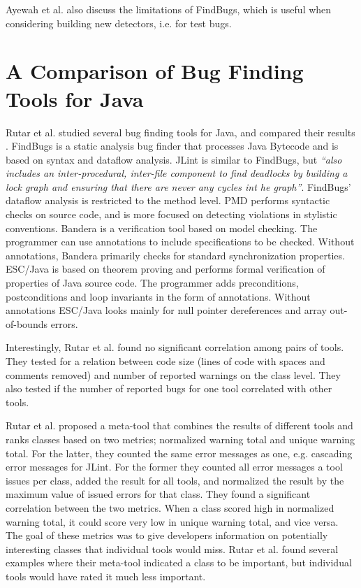 \documentclass{uvamscse}
\newcommand{\AFBEval}{Ayewah et al.}
\newcommand{\AComparisonBugTools}{Rutar et al.}
\begin{document}
\AFBEval{} also discuss the limitations of FindBugs, which is useful when considering building new detectors, i.e. for test bugs.

\section{A Comparison of Bug Finding Tools for Java}
\AComparisonBugTools{} studied several bug finding tools for Java, and compared their results \cite{rutar2004comparison}. FindBugs is a static analysis bug finder that processes Java Bytecode and is based on syntax and dataflow analysis. JLint is similar to FindBugs, but \textit{``also includes an inter-procedural, inter-file component to find deadlocks by building a lock graph and ensuring that there are never any cycles int he graph''}. FindBugs' dataflow analysis is restricted to the method level. PMD performs syntactic checks on source code, and is more focused on detecting violations in stylistic conventions. Bandera is a verification tool based on model checking. The programmer can use annotations to include specifications to be checked. Without annotations, Bandera primarily checks for standard synchronization properties. ESC/Java is based on theorem proving and performs formal verification of properties of Java source code. The programmer adds preconditions, postconditions and loop invariants in the form of annotations. Without annotations ESC/Java looks mainly for null pointer dereferences and array out-of-bounds errors. 

Interestingly, \AComparisonBugTools{} found no significant correlation among pairs of tools. They tested for a relation between code size (lines of code with spaces and comments removed) and number of reported warnings on the class level. They also tested if the number of reported bugs for one tool correlated with other tools. 

\AComparisonBugTools{} proposed a meta-tool that combines the results of different tools and ranks classes based on two metrics; normalized warning total and unique warning total. For the latter, they counted the same error messages as one, e.g. cascading error messages for JLint. For the former they counted all error messages a tool issues per class, added the result for all tools, and normalized the result by the maximum value of issued errors for that class. They found a significant correlation between the two metrics. When a class scored high in normalized warning total, it could score very low in unique warning total, and vice versa. The goal of these metrics was to give developers information on potentially interesting classes that individual tools would miss. \AComparisonBugTools{} found several examples where their meta-tool indicated a class to be important, but individual tools would have rated it much less important.



{%


}
\end{document}
